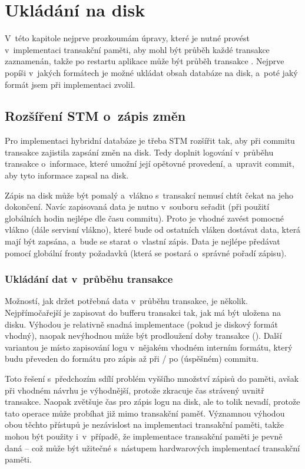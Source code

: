 \chapter{Ukládání na disk}

V~této kapitole nejprve prozkoumám úpravy, které je nutné provést v~implementaci
transakční paměti, aby mohl být průběh každé transakce zaznamenán, takže po restartu
aplikace může být průběh transakce . Nejprve
popíši v~jakých formátech je možné ukládat obsah databáze na disk, a~poté jaký formát
jsem při implementaci zvolil.

\section{Rozšíření STM o~zápis změn}

Pro implementaci hybridní databáze je třeba STM rozšířit tak, aby při commitu transakce
zajistila zapsání změn na disk. Tedy doplnit logování v~průběhu transakce
o~informace, které umožní její opětovné provedení, a~upravit commit, aby tyto informace
zapsal na disk.

Zápis na disk může být pomalý a~vlákno s~transakcí nemusí chtít
čekat na jeho dokončení. Navíc zapisovaná data je nutno v~souboru seřadit (při použití
globálních hodin nejlépe dle času commitu). Proto je vhodné zavést pomocné vlákno (dále
servisní vlákno), které
bude od ostatních vláken dostávat data, která mají být zapsána, a~bude se starat
o~vlastní zápis. Data je nejlépe předávat pomocí globální fronty požadavků
(která se postará o~správné pořadí zápisu).

\subsection{Ukládání dat v~průběhu transakce}
Možností, jak držet potřebná data v~průběhu transakce, je několik. Nejpřímočařejší
je zapisovat do bufferu transakci tak, jak má být uložena
na disku. Výhodou je relativně snadná implementace (pokud je diskový formát vhodný),
naopak nevýhodnou může být prodloužení doby transakce ().
Další variantou je místo zapisování logu v~nějakém vhodném interním formátu, který
budu převeden do formátu pro zápis až při / po (úspěšném) commitu. 

Toto řešení s~předchozím
sdílí problém vyššího množství zápisů do paměti, avšak při vhodném návrhu je výhodnější,
protože zkracuje čas strávený uvnitř transakce. Naopak zvětšuje čas pro zápis logu
na disk, ale to tolik nevadí, protože tato operace může probíhat již mimo transakční
paměť. Významnou výhodou obou těchto přístupů je nezávislost na implementaci
transakční paměti, takže mohou být použity i~v~případě, že implementace transakční
paměti je pevně daná -- což může být užitečné s~nástupem hardwarových implementací
transakční paměti.

